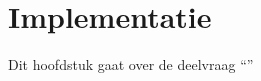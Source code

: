 \chapter{Implementatie}

\label{chapter6}

Dit hoofdstuk gaat over de deelvraag \enquote{\deelimplementatie}